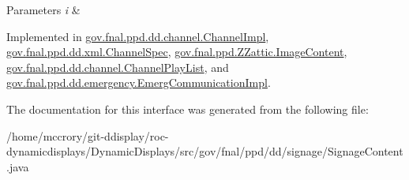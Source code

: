 \begin{DoxyParams}{Parameters}
{\em i} & \\
\hline
\end{DoxyParams}


Implemented in \hyperlink{classgov_1_1fnal_1_1ppd_1_1dd_1_1channel_1_1ChannelImpl_a685f3caf0f4e3d501e68c55794f38111}{gov.\-fnal.\-ppd.\-dd.\-channel.\-Channel\-Impl}, \hyperlink{classgov_1_1fnal_1_1ppd_1_1dd_1_1xml_1_1ChannelSpec_ad7a23aa407de30f14c3546e67c560b38}{gov.\-fnal.\-ppd.\-dd.\-xml.\-Channel\-Spec}, \hyperlink{classgov_1_1fnal_1_1ppd_1_1ZZattic_1_1ImageContent_ab9f1a6ff63fca216fa45b3a952eb03b8}{gov.\-fnal.\-ppd.\-Z\-Zattic.\-Image\-Content}, \hyperlink{classgov_1_1fnal_1_1ppd_1_1dd_1_1channel_1_1ChannelPlayList_a7bb16de560ccbd745ee6a4f12e7756ae}{gov.\-fnal.\-ppd.\-dd.\-channel.\-Channel\-Play\-List}, and \hyperlink{classgov_1_1fnal_1_1ppd_1_1dd_1_1emergency_1_1EmergCommunicationImpl_a1c1908434df69dea4854e5b5f44fff68}{gov.\-fnal.\-ppd.\-dd.\-emergency.\-Emerg\-Communication\-Impl}.



The documentation for this interface was generated from the following file\-:\begin{DoxyCompactItemize}
\item 
/home/mccrory/git-\/ddisplay/roc-\/dynamicdisplays/\-Dynamic\-Displays/src/gov/fnal/ppd/dd/signage/Signage\-Content.\-java\end{DoxyCompactItemize}
